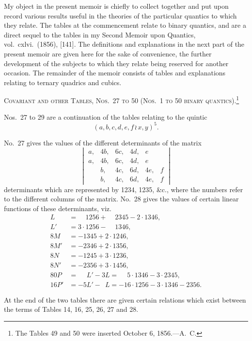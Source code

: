 \documentclass[11pt,a4paper]{article}
\begin{document}
My object in the present memoir is chiefly to collect together and put upon
record various results useful in the theories of the particular quantics to which
they relate. The tables at the commencement relate to binary quantics, and are a
direct sequel to the tables in my Second Memoir upon Quantics, vol.~cxlvi.~(1856), [141].
The definitions and explanations in the next part of the present memoir are given
here for the sake of convenience, the further development of the subjects to which
they relate being reserved for another occasion. The remainder of the memoir consists
of tables and explanations relating to ternary quadrics and cubics.

\bigskip
\noindent\textsc{Covariant and other Tables, Nos.~27 to 50 (Nos.~1 to 50 binary quantics).}\footnote{The Tables 49 and 50 were inserted October 6, 1856.---A.~C.}

Nos.~27 to 29 are a continuation of the tables relating to the quintic
\[(a, b, c, d, e, f \, \wr\, x, y)^5.\]

No.~27 gives the values of the different determinants of the matrix
\[
\begin{vmatrix}
a, & 4b, & 6c, & 4d, & e \\
a, & 4b, & 6c, & 4d, & e \\
  & b, & 4c, & 6d, & 4e, & f \\
  & b, & 4c, & 6d, & 4e, & f
\end{vmatrix}
\]
determinants which are represented by 1234, 1235, \&c., where the numbers refer to
the different columns of the matrix. No.~28 gives the values of certain linear
functions of these determinants, viz.
\begin{align*}
L &= \phantom{3\cdot}1256 + \phantom{2\cdot}2345 - 2\cdot 1346,\\
L' &= 3\cdot 1256 - \phantom{3\cdot}1346,\\
8M &= -1345 + 2\cdot 1246,\\
8M' &= -2346 + 2\cdot 1356,\\
8N &= -1245 + 3\cdot 1236,\\
8N' &= -2356 + 3\cdot 1456,\\
80P &= \phantom{-5}L' - 3L = \phantom{-}5\cdot 1346 - 3\cdot 2345,\\
16P' &= -5L' - \phantom{3}L = -16\cdot 1256 - 3\cdot 1346 - 2356.
\end{align*}

At the end of the two tables there are given certain relations which exist between
the terms of Tables 14, 16, 25, 26, 27 and 28.
\end{document}
